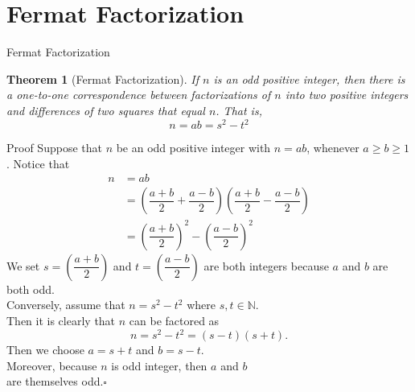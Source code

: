 \documentclass[11pt,aspectratio=43,xcolor={dvipsnames},notheorems]{beamer}
\theoremstyle{definition}
\theoremstyle{plain}
\newtheorem{theorem}{Theorem}[]
\theoremstyle{remark}
\newcommand{\N}{\mathbb{N}}
\begin{document}
\section{Fermat Factorization}
\begin{frame}{Fermat Factorization}
    \begin{theorem}[Fermat Factorization]
        If $n$ is an odd positive integer, then there is a one-to-one correspondence between factorizations of $n$ into two positive integers and differences of two squares that equal $n$. That is,
        $$n=ab=s^2-t^2$$
    \end{theorem}
\end{frame}
\begin{frame}[allowframebreaks,t]{Proof}
    Suppose that $n$ be an odd positive integer with $n=ab$, whenever $a\ge b\ge 1$. Notice that
    \begin{align*}
        n&=ab\\
        &=\left(\dfrac{a+b}{2}+\dfrac{a-b}{2}\right)\left(\dfrac{a+b}{2}-\dfrac{a-b}{2}\right)\\
        &=\left(\dfrac{a+b}{2}\right)^2-\left(\dfrac{a-b}{2}\right)^2
    \end{align*}
    We set $s=\left(\dfrac{a+b}{2}\right)$ and $t=\left(\dfrac{a-b}{2}\right)$ are both integers because $a$ and $b$ are both odd.\vspace{2\baselineskip}\\
    Conversely, assume that $n=s^2-t^2$ where $s,t\in\N$.\\
    Then it is clearly that $n$ can be factored as
    $$n=s^2-t^2=(s-t)(s+t).$$
    Then we choose $a=s+t$ and $b=s-t$.\\
    Moreover, because $n$ is odd integer, then $a$ and $b$\\
    are themselves odd.\hfill$\square$
\end{frame}
\end{document}
